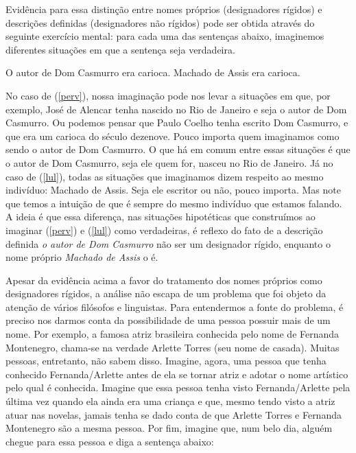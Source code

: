 Evidência para essa distinção entre nomes próprios
(designadores rígidos) e descrições definidas
(designadores não rígidos) pode ser obtida através do
seguinte exercício mental: para cada uma das sentenças abaixo,
imaginemos diferentes situações em que a sentença seja verdadeira.

\begin{exe}
\ex O autor de Dom Casmurro era carioca.\label{perv}
\ex Machado de Assis era carioca.\label{lul}
\end{exe}

No caso de (\ref{perv}), nossa imaginação pode nos levar a
situações em que, por exemplo, José de Alencar tenha nascido no
Rio de Janeiro e seja o autor de Dom Casmurro. Ou podemos pensar
que Paulo Coelho tenha escrito Dom Casmurro, e que era um carioca
do século dezenove. Pouco importa quem imaginamos como sendo o
autor de Dom Casmurro. O que há em comum entre essas situações é
que o autor de Dom Casmurro, seja ele quem for, nasceu no Rio de
Janeiro. Já no caso de (\ref{lul}), todas as situações que
imaginamos dizem respeito ao mesmo indivíduo: Machado de Assis.
Seja ele escritor ou não, pouco importa. Mas note que temos a
intuição de que é sempre do mesmo indivíduo que estamos falando. A
ideia é que essa diferença, nas situações hipotéticas que
construímos ao imaginar (\ref{perv}) e (\ref{lul}) como verdadeiras,
é reflexo do fato de a descrição definida \textit{o autor de Dom
Casmurro} não ser um designador rígido, enquanto o nome
próprio \textit{Machado de Assis} o é.

Apesar da evidência acima a favor do tratamento dos nomes próprios
como designadores rígidos, a análise não escapa de um problema que
foi objeto da atenção de vários filósofos e linguistas. Para
entendermos a fonte do problema, é preciso nos darmos conta da
possibilidade de uma pessoa possuir mais de um nome. Por exemplo,
a famosa atriz brasileira conhecida pelo nome de Fernanda
Montenegro, chama-se na verdade Arlette Torres (seu nome de
casada). Muitas pessoas, entretanto, não sabem disso. Imagine,
agora, uma pessoa que tenha conhecido Fernanda/Arlette antes de ela
se tornar atriz e adotar o nome artístico pelo qual é conhecida.
Imagine que essa pessoa tenha visto Fernanda/Arlette pela última
vez quando ela ainda era uma criança e que, mesmo tendo visto a atriz atuar nas novelas, jamais tenha se dado conta de que Arlette Torres e
Fernanda Montenegro são a mesma pessoa. Por fim, imagine que, num
belo dia, alguém chegue para essa pessoa e diga a sentença abaixo:

